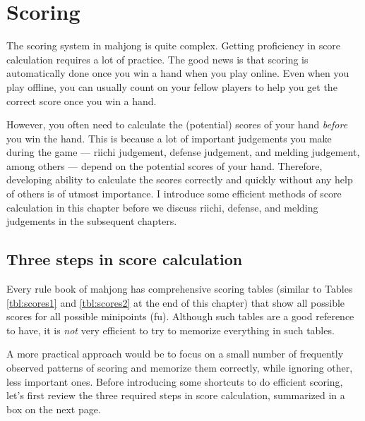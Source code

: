 
\chapter{Scoring}\label{ch:scores}
\thispagestyle{empty}

The scoring system in mahjong is quite complex. Getting proficiency in score calculation requires a lot of practice. The good news is that scoring is automatically done once you win a hand when you play online. Even when you play offline, you can usually count on your fellow players to help you get the correct score once you win a hand. 

\bigskip
However, you often need to calculate the (potential) scores of your hand \emph{before} you win the hand. This is because a lot of important judgements you make during the game --- riichi judgement, defense judgement, and melding judgement, among others --- depend on the potential scores of your hand. Therefore, developing ability to calculate the scores correctly and quickly without any help of others is of utmost importance. I introduce some efficient methods of score calculation in this chapter before we discuss riichi, defense, and melding judgements in the subsequent chapters. 

\section{Three steps in score calculation}

Every rule book of mahjong has comprehensive scoring tables (similar to Tables \ref{tbl:scores1} and \ref{tbl:scores2} at the end of this chapter) that show all possible scores for all possible minipoints ({\jap fu}). Although such tables are a good reference to have, it is \emph{not} very efficient to try to memorize everything in such tables. 

\bigskip
A more practical approach would be to focus on a small number of frequently observed patterns of scoring and memorize them correctly, while ignoring other, less important ones. Before introducing some shortcuts to do efficient scoring, let's first review the three required steps in score calculation, summarized in a box on the next page.
\bigskip

